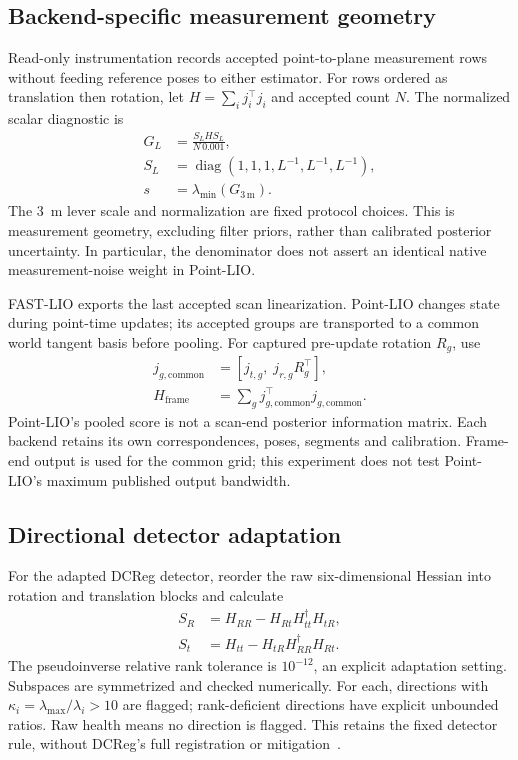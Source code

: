 \documentclass[conference]{IEEEtran}
\newcommand{\diag}{\operatorname{diag}}
\begin{document}
\subsection{Backend-specific measurement geometry}
Read-only instrumentation records accepted point-to-plane measurement rows
without feeding reference poses to either estimator. For rows ordered as
translation then rotation, let $H=\sum_i j_i^\top j_i$ and accepted count $N$.
The normalized scalar diagnostic is
\begin{align}
G_L&=\frac{S_L H S_L}{N\,0.001},\\
S_L&=\diag(1,1,1,L^{-1},L^{-1},L^{-1}),\\
s&=\lambda_{\min}(G_{3\,\mathrm m}).
\end{align}
The 3~m lever scale and normalization are fixed protocol choices. This is
measurement geometry, excluding filter priors, rather than calibrated
posterior uncertainty. In particular, the denominator does not assert an
identical native measurement-noise weight in Point-LIO.

FAST-LIO exports the last accepted scan linearization. Point-LIO changes
state during point-time updates; its accepted groups are transported to a
common world tangent basis before pooling. For captured pre-update rotation
$R_g$, use
\begin{align}
j_{g,\mathrm{common}}&=[j_{t,g},\;j_{r,g}R_g^\top],\\
H_{\mathrm{frame}}&=\sum_g j_{g,\mathrm{common}}^\top j_{g,\mathrm{common}}.
\end{align}
Point-LIO's pooled score is not a scan-end posterior information matrix.
Each backend retains its own correspondences, poses, segments and calibration.
Frame-end output is used for the common grid; this experiment does not test
Point-LIO's maximum published output bandwidth.

\subsection{Directional detector adaptation}
For the adapted DCReg detector, reorder the raw six-dimensional Hessian
into rotation and translation blocks and calculate
\begin{align}
S_R&=H_{RR}-H_{Rt}H_{tt}^{\dagger}H_{tR},\\
S_t&=H_{tt}-H_{tR}H_{RR}^{\dagger}H_{Rt}.
\end{align}
The pseudoinverse relative rank tolerance is $10^{-12}$, an explicit
adaptation setting. Subspaces are symmetrized and checked numerically.
For each, directions with $\kappa_i=\lambda_{\max}/\lambda_i>10$ are flagged;
rank-deficient directions have explicit unbounded ratios. Raw health means
no direction is flagged. This retains the fixed detector rule, without
DCReg's full registration or mitigation~\cite{dcreg}.
\end{document}
